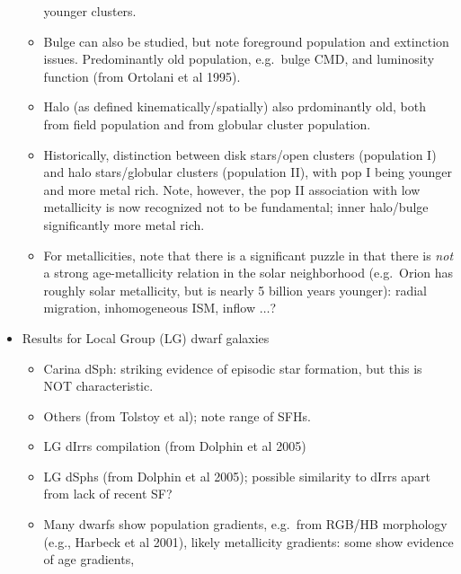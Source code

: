 \documentclass{article}
\begin{document}
\begin{itemize}
\begin{itemize}
                      younger clusters.
                  \item Bulge can also be studied, but note foreground population
                      and extinction issues. Predominantly old population,
                      e.g.\ {bulge CMD}, and
                      {luminosity function} (from {Ortolani
                      et al 1995}).
                  \item Halo (as defined kinematically/spatially) also
                      prdominantly old, both from field population and from
                      globular cluster population.
                  \item Historically, distinction between disk stars/open
                      clusters (population I) and halo stars/globular clusters
                      (population II), with pop I being younger and more metal
                      rich. Note, however, the pop II association with low
                      metallicity is now recognized not to be fundamental;
                      inner halo/bulge significantly more metal rich.
                  \item For metallicities, note that there is a significant
                      puzzle in that there is \emph{not} a strong age-metallicity
                      relation in the solar neighborhood (e.g.\ Orion has
                      roughly solar metallicity, but is nearly 5 billion years
                      younger): radial migration, inhomogeneous ISM, inflow
                      $\ldots$?
              \end{itemize}
          \item Results for Local Group (LG) dwarf galaxies
              \begin{itemize}
                  \item Carina dSph: striking evidence of episodic star
                      formation, but this is NOT characteristic.
                  \item Others (from Tolstoy et al); note range of SFHs.
                  \item LG dIrrs compilation (from Dolphin et al 2005)
                  \item LG dSphs (from Dolphin et al 2005); possible similarity
                      to dIrrs apart from lack of recent SF?
                  \item Many dwarfs show population gradients, e.g.\ from
                      RGB/HB morphology (e.g., Harbeck et al 2001), likely
                      metallicity gradients: some show evidence of age gradients,

\end{itemize}
\end{itemize}
\end{document}
